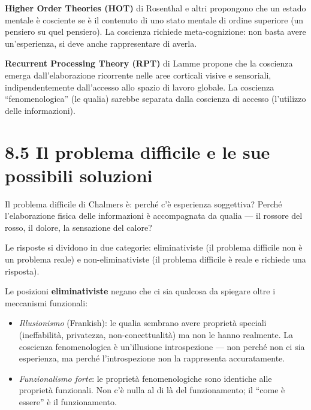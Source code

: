 \documentclass[11.5pt,a4paper,openany]{book}
\theoremstyle{remark}
\begin{document}
\textbf{Higher Order Theories (HOT)} di Rosenthal e altri propongono che un estado mentale è cosciente se è il contenuto di uno stato mentale di ordine superiore (un pensiero su quel pensiero). La coscienza richiede meta-cognizione: non basta avere un'esperienza, si deve anche rappresentare di averla.

\textbf{Recurrent Processing Theory (RPT)} di Lamme propone che la coscienza emerga dall'elaborazione ricorrente nelle aree corticali visive e sensoriali, indipendentemente dall'accesso allo spazio di lavoro globale. La coscienza ``fenomenologica'' (le qualia) sarebbe separata dalla coscienza di accesso (l'utilizzo delle informazioni).

\section{8.5 Il problema difficile e le sue possibili soluzioni}

Il problema difficile di Chalmers è: perché c'è esperienza soggettiva? Perché l'elaborazione fisica delle informazioni è accompagnata da qualia --- il rossore del rosso, il dolore, la sensazione del calore?

Le risposte si dividono in due categorie: eliminativiste (il problema difficile non è un problema reale) e non-eliminativiste (il problema difficile è reale e richiede una risposta).

Le posizioni \textbf{eliminativiste} negano che ci sia qualcosa da spiegare oltre i meccanismi funzionali:
\begin{itemize}
\item \textit{Illusionismo} (Frankish): le qualia sembrano avere proprietà speciali (ineffabilità, privatezza, non-concettualità) ma non le hanno realmente. La coscienza fenomenologica è un'illusione introspezione --- non perché non ci sia esperienza, ma perché l'introspezione non la rappresenta accuratamente.
\item \textit{Funzionalismo forte}: le proprietà fenomenologiche sono identiche alle proprietà funzionali. Non c'è nulla al di là del funzionamento; il ``come è essere'' è il funzionamento.
\end{itemize}
\end{document}
